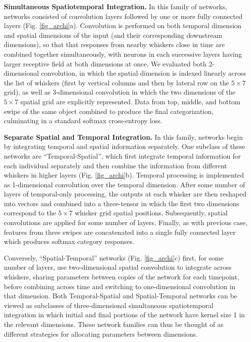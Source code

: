 \textbf{Simultaneous Spatiotemporal Integration.}
In this family of networks, networks consisted of convolution layers followed by one or more fully connected layers (Fig. \ref{fig_archi}a).  Convolution is performed on both temporal dimension and spatial dimensions of the input (and their corresponding downstream dimensions), so that that responses from nearby whiskers close in time are combined together simultaneously, with neurons in each successive layers having larger receptive field at both dimensions at once.
We evaluated both 2-dimensional convolution, in which the spatial dimension is indexed linearly across the list of whiskers (first by vertical columns and then by lateral row on the $5\times7$ grid), as well as 3-dimensional convolution in which the two dimensions of the $5\times7$ spatial grid are explicitly represented.
Data from top, middle, and bottom swipe of the same object combined to produce the final categorization, culminating in a standard softmax cross-entropy loss.  


\textbf{Separate Spatial and Temporal Integration.} In this family, networks begin by integrating temporal and spatial information separately.  
One subclass of these networks are ``Temporal-Spatial'', which first integrate temporal information for each individual separately and then combine the information from different whiskers in higher layers (Fig. \ref{fig_archi}b).
Temporal processing is implemented as 1-dimensional convolution over the temporal dimension. 
After some number of layers of temporal-only processing, the outputs at each whisker are then reshaped into vectors and combined into a three-tensor in which the first two dimensions correspond to the $5\times7$ whisker grid spatial positions.  Subsequently, spatial convolutions are applied for some number of layers. 
Finally, as with previous case, features from three swipes  are concatenated into a single fully connected layer which produces softmax category responses.

Conversely, ``Spatial-Temporal'' networks (Fig. \ref{fig_archi}c) first, for some number of layers, use two-dimensional spatial convolution to integrate across whiskers, sharing parameters between copies of the network for each timepoint, before combining across time and switching to one-dimensional convolution in that dimension.  
Both Temporal-Spatial and Spatial-Temporal networks can be viewed as subclasses of three-dimensional simultaneous spatiotemporal integration in which initial and final portions of the network have kernel size 1 in the relevant dimensions.  
These network families can thus be thought of as different strategies for allocating parameters between dimensions. 


